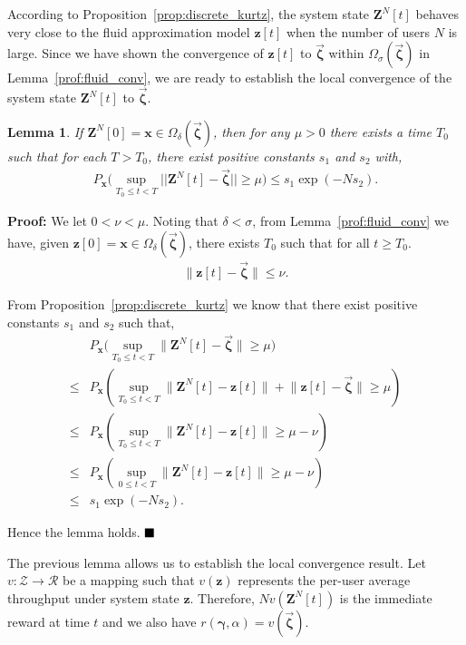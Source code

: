 \documentclass[11pt,twocolumn]{IEEEtran}
\newtheorem{lemma}{Lemma}
\begin{document}
According to Proposition~\ref{prop:discrete_kurtz}, the system state $\bm Z^N[t]$ behaves very close to the fluid approximation model $\bm z[t]$ when the number of users $N$ is large. Since we have shown the convergence of $\bm z[t]$ to $\vec{\bm \zeta}$ within $\Omega_{\sigma}(\vec{\bm \zeta})$ in Lemma~\ref{prof:fluid_conv}, we are ready to establish the local convergence of the system state $\bm Z^N[t]$ to $\vec{\bm \zeta}$.

\begin{lemma}
\label{lemma:Kurtz_Index}
If $\bm Z^N[0]=\bm x \in \Omega_{\delta}(\vec{\bm \zeta})$, then for any $\mu>0$ there exists a time $T_0$ such that for each $T >T_0$, there exist positive constants $s_1$ and $s_2$ with,
\begin{align}
P_{\bm x}\Big( \sup_{T_0 \leq t < T} ||\bm Z^{N}[t]-\vec{\bm \zeta} || \geq \mu \Big)\leq s_1 \exp(-N s_2). \nonumber
\end{align}
\end{lemma}

\noindent \textbf{Proof:}
We let $0<\nu<\mu$. Noting that $\delta<\sigma$, from Lemma~\ref{prof:fluid_conv} we have, given $\bm z[0]=\bm x\in\Omega_{\delta}(\vec{\bm \zeta})$, there exists $T_0$ such that for all $t \geq T_0$.
\begin{align}
\nonumber
\big\|\bm z[t]- \vec{\bm \zeta}\big\| \leq \nu.
\end{align}

From Proposition~\ref{prop:discrete_kurtz} we know that there exist positive constants $s_1$ and $s_2$ such that,
\begin{align}
&P_{\bm x}\Big(\sup_{T_0 \leq t < T} \big\| \bm Z^{{N}}[t]{-}\vec{\bm \zeta} \big\| \geq \mu \Big)\nonumber\\
\leq& P_{\bm x}(\sup_{T_0 \leq t < T} \big\|\bm Z^{N}[t]{-}\bm z[t]\big\|{+}\big\|\bm z[t] {-} \vec{\bm \zeta}\big\|\geq \mu) \nonumber\\
\leq& P_{\bm x}(\sup_{T_0 \leq t < T} \big\|\bm Z^{N}[t]{-}\bm z[t]\big\|\geq \mu{-}\nu) \nonumber \\
\leq &  P_{\bm x}(\sup_{0 \leq t < T} \big\|\bm Z^{N}[t]{-}\bm z[t]\big\|\geq \mu{-}\nu) \nonumber \\
\leq &  s_1 \exp(-N s_2). \nonumber
\end{align}

Hence the lemma holds. $\hfill \blacksquare$
\vspace{3pt}

The previous lemma allows us to establish the local convergence result. Let $v: \mathcal{Z}\rightarrow \mathcal{R}$ be a mapping such that $v(\bm z)$ represents the per-user average throughput under system state $\bm z$. Therefore, $N v(\bm Z^N[t])$ is the immediate reward at time $t$ and we also have $r(\bm \gamma, \alpha)=v(\vec{\bm \zeta})$.
\end{document}
